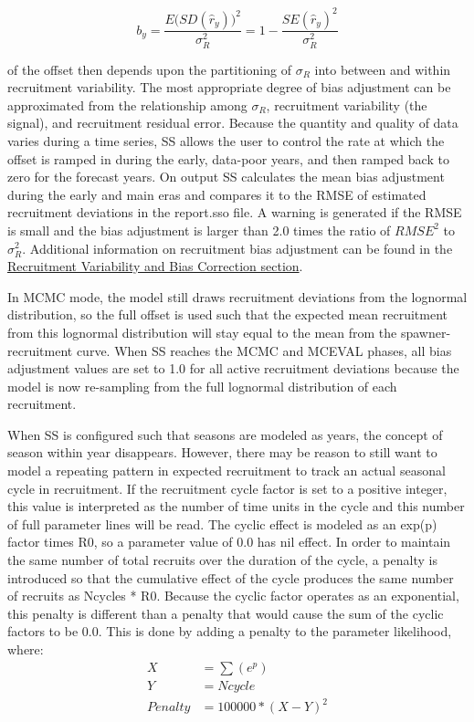 \begin{equation}
	b_y=\frac{E\Big( SD(\hat{r}_y)\Big)^2}{\sigma^2_R}=1-\frac{SE(\hat{r}_y)^2}{\sigma^2_R}
\end{equation}

\noindent of the offset then depends upon the partitioning of $\sigma_R$ into between and within recruitment variability.  The most appropriate degree of bias adjustment can be approximated from the relationship among $\sigma_R$, recruitment variability (the signal), and recruitment residual error. Because the quantity and quality of data varies during a time series, SS allows the user to control the rate at which the offset is ramped in during the early, data-poor years, and then ramped back to zero for the forecast years. On output SS calculates the mean bias adjustment during the early and main eras and compares it to the RMSE of estimated recruitment deviations in the report.sso file. A warning is generated if the RMSE is small and the bias adjustment is larger than 2.0 times the ratio of $RMSE^2$ to $\sigma^2_R$. Additional information on recruitment bias adjustment can be found in the \hyperlink{BiasCorrect}{Recruitment Variability and Bias Correction section}.

In MCMC mode, the model still draws recruitment deviations from the lognormal distribution, so the full offset is used such that the expected mean recruitment from this lognormal distribution will stay equal to the mean from the spawner-recruitment curve. When SS reaches the MCMC and MCEVAL phases, all bias adjustment values are set to 1.0 for all active recruitment deviations because the model is now re-sampling from the full lognormal distribution of each recruitment.

When SS is configured such that seasons are modeled as years, the concept of season within year disappears.  However, there may be reason to still want to model a repeating pattern in expected recruitment to track an actual seasonal cycle in recruitment.  If the recruitment cycle factor is set to a positive integer, this value is interpreted as the number of time units in the cycle and this number of full parameter lines will be read. The cyclic effect is modeled as an exp(p) factor times R0, so a parameter value of 0.0 has nil effect. In order to maintain the same number of total recruits over the duration of the cycle, a penalty is introduced so that the cumulative effect of the cycle produces the same number of recruits as Ncycles * R0. Because the cyclic factor operates as an exponential, this penalty is different than a penalty that would cause the sum of the cyclic factors to be 0.0.  This is done by adding a penalty to the parameter likelihood, where:
\begin{equation}
	\begin{split}
				   X & = \sum(e^p)  \\
				   Y & = Ncycle  \\
				   Penalty & = 100000*(X-Y)^2
	\end{split}
\end{equation}

